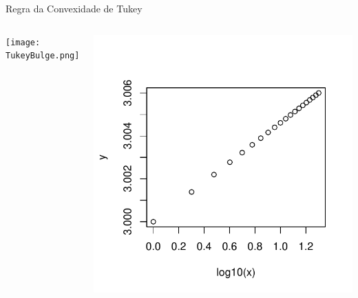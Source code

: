 \documentclass{beamer}\usepackage[]{graphicx}\usepackage[]{color}
\newenvironment{knitrout}{}{} %
\renewenvironment{knitrout}{\setlength{\topsep}{0mm}}{}
\begin{document}
\begin{frame}{Regra da Convexidade de Tukey}

\begin{columns}[c]

\centering
\texttt{[image: TukeyBulge.png]}

\centering
\begin{knitrout}
\color{fgcolor}
\includegraphics[width=0.7\linewidth]{figure/rem8-1} 

\end{knitrout}

\end{columns}

\end{frame}
\end{document}
